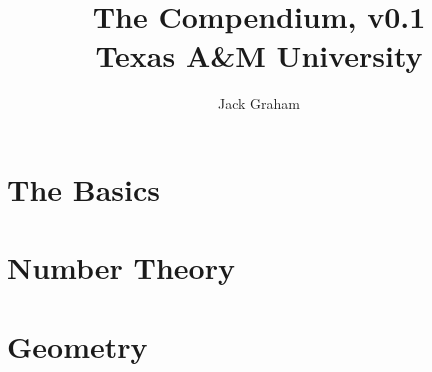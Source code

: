 \documentclass{report}
\title{
	{The Compendium, v0.1}\\
	{Texas A\&M University}
}
\author{Jack Graham}
\begin{document}
\maketitle

\tableofcontents

\chapter{The Basics}
  

\chapter{Number Theory}
  

\chapter{Geometry}

\chapter{}
\end{document}
